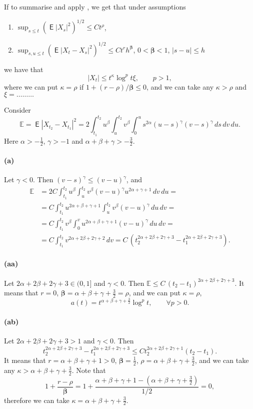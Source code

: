\documentclass{article}
\DeclareMathOperator{\ME}{\mathsf{E}}
\theoremstyle{plain}
\theoremstyle{remark}
\theoremstyle{definition}
\begin{document}
If to summarise and apply \cite[Corollary~2.10]{DKM},
we get that under assumptions
\begin{enumerate}
	\def\labelenumi{(\roman{enumi})}
	\item $\displaystyle
		\sup_{s\le t} (\ME |X_s|^2)^{1/2} \le C t^\rho$,
	\item $\displaystyle
		\sup_{s,u\le t} (\ME |X_t - X_s|^2)^{1/2} \le
		C t^r h^{\boldsymbol\beta}$,\quad
		$0\mathbin{<}\boldsymbol{\beta}\mathbin{<}1$,\quad
		$|s - u| \boldsymbol{\le} h$
\end{enumerate}
we have that
\[
	|X_t| \le t^{\kappa} \log^p t \xi,
	\qquad
	p\mathbin{>}1,
\]
where we can put $\kappa = \rho$ if
$1 + (r-\rho)/{\boldsymbol{\beta}} \le 0$,
and we can take any $\kappa>\rho$ and $\xi = \ldots\ldots\ldots$

Consider
\[
\mathbb{E}
=
\ME|X_{t_2} - X_{t_1}|^2
=
2 \int_{t_1}^{t_2} u^\beta
\int_u^{t_2} v^\beta
\int_0^u s^{2\alpha} (u-s)^\gamma (v-s)^\gamma
\, ds \, dv \, du .
\]
Here $\alpha>-\frac12$, $\gamma>-1$ and $\alpha+\beta+\gamma>-\frac32$.

\paragraph{(a)}
Let $\gamma<0$.
Then $(v-s)^\gamma \le (v-u)^\gamma$, and
\begin{align*}
	\mathbb{E}
	&=
	2 C \int_{t_1}^{t_2} u^\beta
	\int_u^{t_2} v^\beta (v-u)^\gamma u^{2\alpha+\gamma+1} \, dv \, du
	= \\ &=
	C \int_{t_1}^{t_2} u^{2\alpha + \beta + \gamma + 1}
	\int_u^{t_2} v^\beta (v-u)^\gamma \, du \, dv
	= \\ &=
	C \int_{t_1}^{t_2} v^\beta
	\int_0^v u^{2\alpha+\beta+\gamma+1}
	(v-u)^\gamma \, du \, dv
	= \\ &=
	C \int_{t_1}^{t_2} v^{2\alpha + 2\beta + 2\gamma + 2} \, dv
	=
	C \, (t_2^{2\alpha + 2\beta + 2\gamma + 3} -
	      t_1^{2\alpha + 2\beta + 2\gamma + 3}) .
\end{align*}
\paragraph{(aa)}
Let $2\alpha + 2\beta + 2\gamma + 3 \in (0,1]$ and $\gamma<0$.
Then
$\mathbb{E} \le C \, (t_2 - t_1)^{2\alpha + 2\beta + 2\gamma +3}.$
It means that
$r=0$,
$\boldsymbol{\beta} = \alpha + \beta + \gamma + \frac32 = \rho$,
and we can put $\kappa = \rho$,
\[
	a(t) = t^{\alpha + \beta + \gamma + \frac32} \log^p t,
	\qquad
	\forall p>0.
\]
\paragraph{(ab)}
Let $2\alpha + 2\beta + 2\gamma + 3 > 1$ and $\gamma < 0$.
Then
\[
	t_2^{2\alpha+2\beta+2\gamma+3} - t_1^{2\alpha+2\beta+2\gamma+3}
	\le
	C t_2^{2\alpha+2\beta+2\gamma+1} (t_2-t_1) .
\]
It means that $r=\alpha+\beta+\gamma+1>0$,
$\boldsymbol{\beta} = \frac12$,
$\rho = \alpha+\beta+\gamma+\frac32$,
and we can take any $\kappa > \alpha+\beta+\gamma+\frac32$.
Note that
\[
	1 + \frac{r-\rho}{\boldsymbol{\beta}}
	=
	1 + \frac{\alpha + \beta + \gamma + 1 -
	(\alpha + \beta + \gamma + \frac32)}
	{1/2} = 0,
\]
therefore we can take $\kappa = \alpha + \beta + \gamma + \frac32$.
\end{document}
